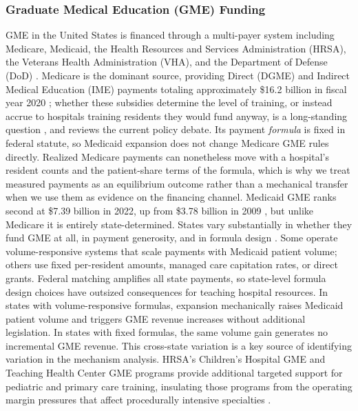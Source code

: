 \subsubsection{Graduate Medical Education (GME) Funding}\label{sec:gme_funding}

GME in the United States is financed through a multi-payer system including Medicare, Medicaid, the Health Resources and Services Administration (HRSA), the Veterans Health Administration (VHA), and the Department of Defense (DoD) \autocite{he2021}. Medicare is the dominant source, providing Direct (DGME) and Indirect Medical Education (IME) payments totaling approximately \$16.2 billion in fiscal year 2020 \autocite{crs2022}; whether these subsidies determine the level of training, or instead accrue to hospitals training residents they would fund anyway, is a long-standing question \autocite{newhouse2001paying, nicholson2002physician}, and \textcite{medpac2023} reviews the current policy debate. Its payment \emph{formula} is fixed in federal statute, so Medicaid expansion does not change Medicare GME rules directly. Realized Medicare payments can nonetheless move with a hospital's resident counts and the patient-share terms of the formula, which is why we treat measured payments as an equilibrium outcome rather than a mechanical transfer when we use them as evidence on the financing channel. Medicaid GME ranks second at \$7.39 billion in 2022, up from \$3.78 billion in 2009 \autocite{henderson2021, henderson2023}, but unlike Medicare it is entirely state-determined. States vary substantially in whether they fund GME at all, in payment generosity, and in formula design \autocite{eden2014, henderson2016, henderson2021, henderson2023, ncsl2024}. Some operate volume-responsive systems that scale payments with Medicaid patient volume; others use fixed per-resident amounts, managed care capitation rates, or direct grants. Federal matching amplifies all state payments, so state-level formula design choices have outsized consequences for teaching hospital resources. In states with volume-responsive formulas, expansion mechanically raises Medicaid patient volume and triggers GME revenue increases without additional legislation. In states with fixed formulas, the same volume gain generates no incremental GME revenue. This cross-state variation is a key source of identifying variation in the mechanism analysis. HRSA's Children's Hospital GME and Teaching Health Center GME programs provide additional targeted support for pediatric and primary care training, insulating those programs from the operating margin pressures that affect procedurally intensive specialties \autocite{he2021}.

